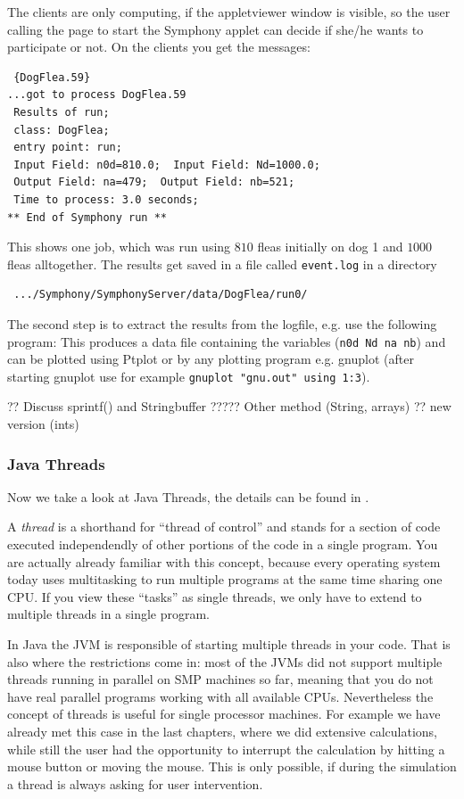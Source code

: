 The clients are only computing, if the appletviewer window is visible, so
the user calling the page to start the Symphony applet can decide if she/he
wants to participate or not. On the clients you get the messages:
\begin{small}
\begin{verbatim}
 {DogFlea.59} 
...got to process DogFlea.59
 Results of run; 
 class: DogFlea; 
 entry point: run;  
 Input Field: n0d=810.0;  Input Field: Nd=1000.0; 
 Output Field: na=479;  Output Field: nb=521; 
 Time to process: 3.0 seconds;  
** End of Symphony run **   
\end{verbatim} 
\end{small}
This shows one job, which was run using $810$ fleas initially on dog 1 and
$1000$ fleas alltogether. The results get saved in a file called \verb|event.log|
in a directory 
\begin{verbatim}
 .../Symphony/SymphonyServer/data/DogFlea/run0/ 
\end{verbatim}
The second step is to extract the results from the logfile, e.g. use the
following program:
This produces a data file containing the variables (\verb|n0d Nd na nb|) 
and can be plotted using Ptplot or by any plotting program e.g. gnuplot (after 
starting gnuplot use for example \verb|gnuplot "gnu.out" using 1:3|).


?? Discuss sprintf() and Stringbuffer
????? Other method (String, arrays)
?? new version (ints)



\subsubsection{Java Threads}
\label{sec:JavaThreads}

Now we take a look at Java Threads, the details can be found in
\cite[]{JavaThreads}. 

A \emph{thread} is a shorthand for ``thread of control'' and stands for a
section of code executed independendly of other portions of the code
 in a single program.
You are actually already familiar with this concept, because every operating
system today uses multitasking to run multiple programs at the same time sharing
one CPU. If you view these ``tasks'' as single threads, we only have to
extend to multiple threads in a single program. 

In Java the JVM is responsible
of starting multiple threads in your code. That is also where the restrictions
come in: most of the JVMs did not support multiple threads running in
parallel on SMP machines so far, meaning that you do not have real parallel 
programs working with all available CPUs. Nevertheless the concept
of threads is useful for single processor machines. For example we have 
already met this case in the last chapters, where we did extensive
calculations, while still the user had the opportunity to interrupt the 
calculation by hitting a mouse button or moving the mouse. This is only
possible, if during the simulation a thread is always asking for user 
intervention. 

